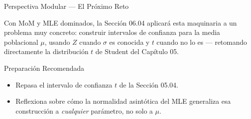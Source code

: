 \documentclass[10pt, aspectratio=169]{beamer}
\begin{document}
\begin{frame}{Perspectiva Modular --- El Próximo Reto}
  \scriptsize
  \begin{retoclase}
    Con MoM y MLE dominados, la Sección 06.04 aplicará esta maquinaria a un problema muy concreto: construir intervalos de confianza para la media poblacional $\mu$, usando $Z$ cuando $\sigma$ es conocida y $t$ cuando no lo es --- retomando directamente la distribución $t$ de Student del Capítulo 05.
  \end{retoclase}

  \vspace{0.08cm}
  \pause
  \begin{alertblock}{Preparación Recomendada}
    \begin{itemize}\itemsep=0.06cm
      \item Repasa el intervalo de confianza $t$ de la Sección 05.04.
      \item Reflexiona sobre cómo la normalidad asintótica del MLE generaliza esa construcción a \emph{cualquier} parámetro, no solo a $\mu$.
    \end{itemize}
  \end{alertblock}
\end{frame}
\end{document}
